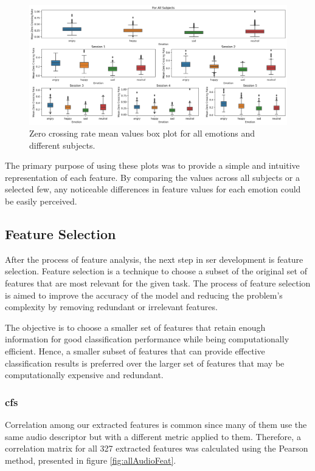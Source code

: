 \begin{figure}[H]
	\centering
	\includegraphics[width=\linewidth]{figs/4_1_traditional/mean_zcr_box_plot.png}
	\caption{Zero crossing rate mean values box plot for all emotions and different subjects.}
	\label{fig:zcrMeanBoxPlot}
\end{figure}

The primary purpose of using these plots was to provide a simple and intuitive representation of each feature. By comparing the values across all subjects or a selected few, any noticeable differences in feature values for each emotion could be easily perceived.

\subsection{Feature Selection}

After the process of feature analysis, the next step in \ac{ser} development is feature selection. Feature selection is a technique to choose a subset of the original set of features that are most relevant for the given task. The process of feature selection is aimed to improve the accuracy of the model and reducing the problem's complexity by removing redundant or irrelevant features. 

The objective is to choose a smaller set of features that retain enough information for good classification performance while being computationally efficient. Hence, a smaller subset of features that can provide effective classification results is preferred over the larger set of features that may be computationally expensive and redundant.

\subsubsection{\acl{cfs}}

Correlation among our extracted features is common since many of them use the same audio descriptor but with a different metric applied to them. Therefore, a correlation matrix for all 327 extracted features was calculated using the Pearson method, presented in figure \ref{fig:allAudioFeat}.

